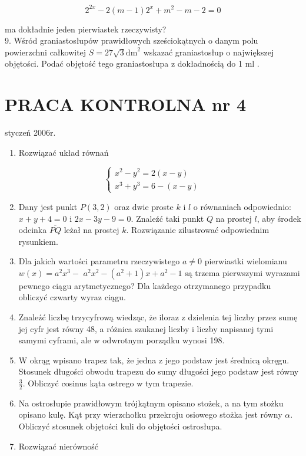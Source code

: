 \documentclass[10pt]{article}
\begin{document}
$$
2^{2 x}-2(m-1) 2^{x}+m^{2}-m-2=0
$$

ma dokładnie jeden pierwiastek rzeczywisty?\\
9. Wśród graniastosłupów prawidłowych sześciokątnych o danym polu powierzchni całkowitej $S=27 \sqrt{3} \mathrm{dm}^{2}$ wskazać graniastosłup o największej objętości. Podać objętość tego graniastosłupa z dokładnością do 1 ml .

\section*{PRACA KONTROLNA nr 4}
styczeń 2006r.

\begin{enumerate}
  \item Rozwiązać układ równań
\end{enumerate}

$$
\left\{\begin{array}{l}
x^{2}-y^{2}=2(x-y) \\
x^{3}+y^{3}=6-(x-y)
\end{array}\right.
$$

\begin{enumerate}
  \setcounter{enumi}{1}
  \item Dany jest punkt $P(3,2)$ oraz dwie proste $k$ i $l$ o równaniach odpowiednio: $x+y+4=0$ i $2 x-3 y-9=0$. Znaleźć taki punkt $Q$ na prostej $l$, aby środek odcinka $\overline{P Q}$ leżał na prostej $k$. Rozwiązanie zilustrować odpowiednim rysunkiem.
  \item Dla jakich wartości parametru rzeczywistego $a \neq 0$ pierwiastki wielomianu $w(x)=a^{2} x^{3}-$ $a^{2} x^{2}-\left(a^{2}+1\right) x+a^{2}-1$ są trzema pierwszymi wyrazami pewnego ciągu arytmetycznego? Dla każdego otrzymanego przypadku obliczyć czwarty wyraz ciągu.
  \item Znaleźć liczbę trzycyfrową wiedząc, że iloraz z dzielenia tej liczby przez sumę jej cyfr jest równy 48, a różnica szukanej liczby i liczby napisanej tymi samymi cyframi, ale w odwrotnym porządku wynosi 198.
  \item W okrąg wpisano trapez tak, że jedna z jego podstaw jest średnicą okręgu. Stosunek długości obwodu trapezu do sumy długości jego podstaw jest równy $\frac{3}{2}$. Obliczyć cosinus kąta ostrego w tym trapezie.
  \item Na ostrosłupie prawidłowym trójkątnym opisano stożek, a na tym stożku opisano kulę. Kąt przy wierzchołku przekroju osiowego stożka jest równy $\alpha$. Obliczyć stosunek objętości kuli do objętości ostrosłupa.
  \item Rozwiązać nierówność
\end{enumerate}
\end{document}
